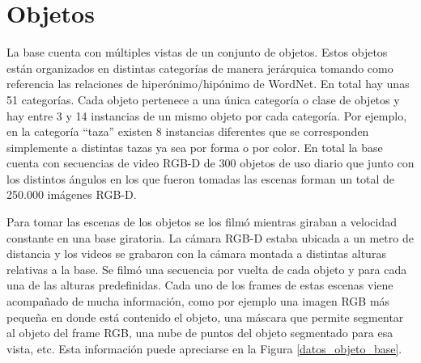 \section{Objetos}
La base cuenta con múltiples vistas de un conjunto de objetos. Estos objetos están organizados en distintas categorías de manera jerárquica tomando como referencia las relaciones de hiperónimo/hipónimo de WordNet. En total hay unas 51 categorías. Cada objeto pertenece a una única categoría o clase de objetos y hay entre 3 y 14 instancias de un mismo objeto por cada categoría. Por ejemplo, en la categoría ``taza'' existen 8 instancias diferentes que se corresponden simplemente a distintas tazas ya sea por forma o por color. En total la base cuenta con secuencias de video RGB-D de 300 objetos de uso diario que junto con los distintos ángulos en los que fueron tomadas las escenas forman un total de 250.000 imágenes RGB-D.

Para tomar las escenas de los objetos se los filmó mientras giraban a velocidad constante en una base giratoria. La cámara RGB-D estaba ubicada a un metro de distancia y los videos se grabaron con la cámara montada a distintas alturas relativas a la base. Se filmó una secuencia por vuelta de cada objeto y para cada una de las alturas predefinidas. Cada uno de los frames de estas escenas viene acompañado de mucha información, como por ejemplo una imagen RGB más pequeña en donde está contenido el objeto, una máscara que permite segmentar al objeto del frame RGB, una nube de puntos del objeto segmentado para esa vista, etc. Esta información puede apreciarse en la Figura \ref{datos_objeto_base}.

